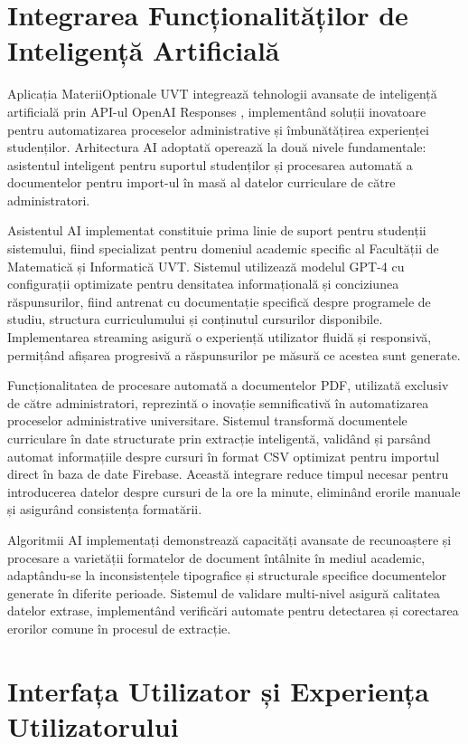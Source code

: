 \documentclass[12pt,a4paper]{report}
\begin{document}
\section{Integrarea Funcționalităților de Inteligență Artificială}

Aplicația MateriiOptionale UVT integrează tehnologii avansate de inteligență artificială prin API-ul OpenAI Responses \cite{openai-api}, implementând soluții inovatoare pentru automatizarea proceselor administrative și îmbunătățirea experienței studenților. Arhitectura AI adoptată operează la două nivele fundamentale: asistentul inteligent pentru suportul studenților și procesarea automată a documentelor pentru import-ul în masă al datelor curriculare de către administratori.

Asistentul AI implementat constituie prima linie de suport pentru studenții sistemului, fiind specializat pentru domeniul academic specific al Facultății de Matematică și Informatică UVT. Sistemul utilizează modelul GPT-4 cu configurații optimizate pentru densitatea informațională și conciziunea răspunsurilor, fiind antrenat cu documentație specifică despre programele de studiu, structura curriculumului și conținutul cursurilor disponibile. Implementarea streaming asigură o experiență utilizator fluidă și responsivă, permițând afișarea progresivă a răspunsurilor pe măsură ce acestea sunt generate.

Funcționalitatea de procesare automată a documentelor PDF, utilizată exclusiv de către administratori, reprezintă o inovație semnificativă în automatizarea proceselor administrative universitare. Sistemul transformă documentele curriculare în date structurate prin extracție inteligentă, validând și parsând automat informațiile despre cursuri în format CSV optimizat pentru importul direct în baza de date Firebase. Această integrare reduce timpul necesar pentru introducerea datelor despre cursuri de la ore la minute, eliminând erorile manuale și asigurând consistența formatării.

Algoritmii AI implementați demonstrează capacități avansate de recunoaștere și procesare a varietății formatelor de document întâlnite în mediul academic, adaptându-se la inconsistențele tipografice și structurale specifice documentelor generate în diferite perioade. Sistemul de validare multi-nivel asigură calitatea datelor extrase, implementând verificări automate pentru detectarea și corectarea erorilor comune în procesul de extracție.

\section{Interfața Utilizator și Experiența Utilizatorului}
\end{document}
